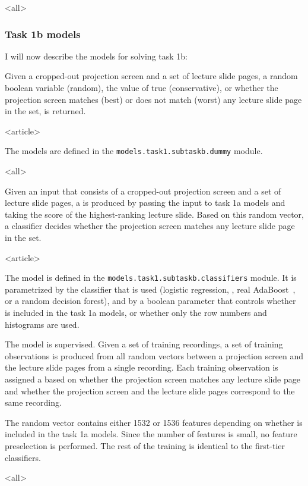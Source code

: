 \mode
<all>

\begin{frame}
\frametitle<presentation>{Task 1b models}
I will now describe the models for solving task 1b:

\begin{description}[<+->]
  \item[Dummy models]
    Given a cropped-out projection screen and a set of lecture slide pages, a
    random boolean variable (random), the value of true (conservative), or
    whether the projection screen matches (best) or does not match (worst) any
    lecture slide page in the set, is returned.

\mode
<article>

    The models are defined in the
    \texttt{models.task1.subtaskb.dummy} module.

\mode
<all>

  \item[Second-tier classifiers]
    Given an input that consists of a cropped-out projection screen and
    a set of lecture slide pages, a  is produced
    by passing the input to task 1a models and taking the score of the
    highest-ranking lecture slide. Based on this random vector, a classifier
    decides whether the projection screen matches any lecture slide page in the
    set.

\mode
<article>

    The model is defined in the \texttt{models.task1.subtaskb.classifiers}
    module. It is parametrized by the classifier that is used (logistic
    regression, , real AdaBoost~\cite{friedman2000additive}, or a
    random decision forest), and by a boolean parameter that controls whether
     is included in the task 1a models, or whether only the row
    numbers and histograms are used.

    The model is supervised. Given a set of training recordings, a set of
    training observations is produced from all random vectors between a
    projection screen and the lecture slide pages from a single recording. Each
    training observation is assigned a  based on whether the
    projection screen matches any lecture slide page and whether the projection
    screen and the lecture slide pages correspond to the same recording.

    The random vector contains either 1532 or 1536 features depending on
    whether  is included in the task 1a models. Since the number of
    features is small, no feature preselection is performed. The rest of the
    training is identical to the first-tier classifiers.

\mode
<all>

\end{description}
\end{frame}

